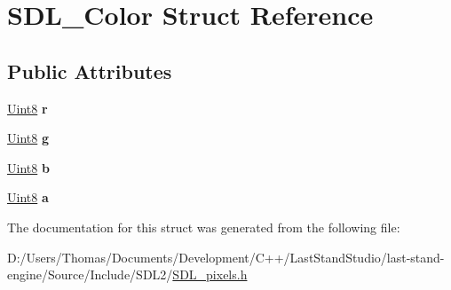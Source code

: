 \hypertarget{structSDL__Color}{}\section{S\+D\+L\+\_\+\+Color Struct Reference}
\label{structSDL__Color}
\subsection*{Public Attributes}
\begin{DoxyCompactItemize}
\item 
\hypertarget{structSDL__Color_a0bb975b6829524133fdd3c6060cfa63d}{}\hyperlink{SDL__stdinc_8h_a2944638813a090aa23e62f4da842c3e2}{Uint8} {\bfseries r}\label{structSDL__Color_a0bb975b6829524133fdd3c6060cfa63d}

\item 
\hypertarget{structSDL__Color_ae29d881bf740cfa7078b36e07f85d298}{}\hyperlink{SDL__stdinc_8h_a2944638813a090aa23e62f4da842c3e2}{Uint8} {\bfseries g}\label{structSDL__Color_ae29d881bf740cfa7078b36e07f85d298}

\item 
\hypertarget{structSDL__Color_a3b79a27e0414049559aa5bcf241dedd3}{}\hyperlink{SDL__stdinc_8h_a2944638813a090aa23e62f4da842c3e2}{Uint8} {\bfseries b}\label{structSDL__Color_a3b79a27e0414049559aa5bcf241dedd3}

\item 
\hypertarget{structSDL__Color_ac497ba67af6ecb4d51bdd0945b314526}{}\hyperlink{SDL__stdinc_8h_a2944638813a090aa23e62f4da842c3e2}{Uint8} {\bfseries a}\label{structSDL__Color_ac497ba67af6ecb4d51bdd0945b314526}

\end{DoxyCompactItemize}


The documentation for this struct was generated from the following file\+:\begin{DoxyCompactItemize}
\item 
D\+:/\+Users/\+Thomas/\+Documents/\+Development/\+C++/\+Last\+Stand\+Studio/last-\/stand-\/engine/\+Source/\+Include/\+S\+D\+L2/\hyperlink{SDL__pixels_8h}{S\+D\+L\+\_\+pixels.\+h}\end{DoxyCompactItemize}
